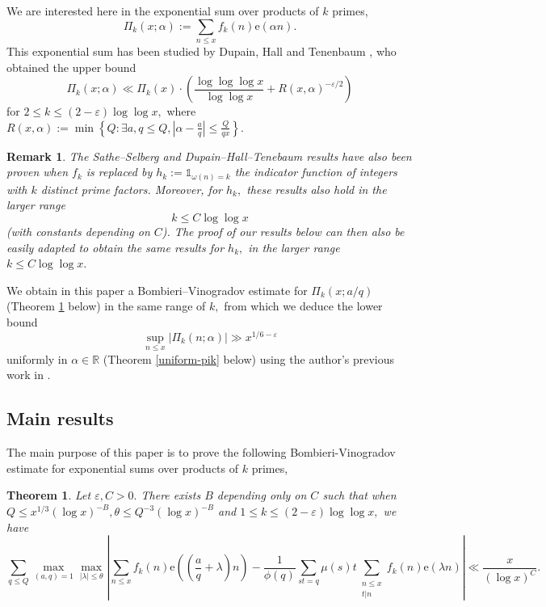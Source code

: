 \documentclass{article}
\newtheorem{theorem}[prop]{Theorem}
\newtheorem*{remark}{Remark}
\newcommand{\e}{\mathrm{e}}
\newcommand{\R}{\mathds{R}}
\newcommand{\Ind}{\mathbb{1}}
\newcommand{\eps}{\varepsilon}
\begin{document}
We are interested here in the exponential sum over products of $k$ primes, $$\Pi_k(x;\alpha) := \sum_{n\le x} f_k(n) \e(\alpha n).$$
This exponential sum has been studied by Dupain, Hall and Tenenbaum \cite{dht, tenenbaum}, who obtained the upper bound \cite[Theorem A]{tenenbaum}
\begin{equation}
    \Pi_k(x;\alpha) \ll \Pi_k(x)\cdot \left(\frac{\log\log\log x}{\log\log x} + R(x,\alpha)^{-\eps/2}\right)
\end{equation}
for $2\le k\le (2-\eps)\log\log x,$ where $R(x,\alpha) := \min\left\{Q: \exists a,q\le Q, \left|\alpha - \frac{a}{q}\right| \le \frac{Q}{qx}\right\}.$
\begin{remark}
    The Sathe--Selberg and Dupain--Hall--Tenebaum results have also been proven when $f_k$ is replaced by $h_k := \Ind_{\omega(n) = k}$ the indicator function of integers with $k$ distinct prime factors. Moreover, for $h_k,$ these results also hold in the larger range $$k \le C \log\log x$$ (with constants depending on $C$). The proof of our results below can then also be easily adapted to obtain the same results for $h_k,$ in the larger range $k\le C\log\log x.$
\end{remark}

We obtain in this paper a Bombieri--Vinogradov estimate for $\Pi_k(x;a/q)$ (Theorem \ref{main} below) in the same range of $k,$ from which we deduce the lower bound $$\sup_{n\le x} |\Pi_k(n;\alpha)| \gg x^{1/6-\eps}$$ uniformly in $\alpha\in\R$ (Theorem \ref{uniform-pik} below) using the author's previous work in \cite{self}.

\subsection{Main results}

The main purpose of this paper is to prove the following Bombieri-Vinogradov estimate for exponential sums over products of $k$ primes,

\begin{theorem}\label{main}
    Let $\eps, C > 0.$ There exists $B$ depending only on $C$ such that when $Q \le x^{1/3}(\log x)^{-B}, \theta \le Q^{-3}(\log x)^{-B}$  and $1 \le k \le (2-\eps)\log\log x,$ we have
    \begin{equation}\label{main-eq}
        \sum_{q\le Q} \max_{(a,q) = 1} \max_{|\lambda|\le\theta} \left|\sum_{n\le x} f_k(n) \e\left(\left(\frac{a}{q}+\lambda\right)n\right) - \frac{1}{\phi(q)}\sum_{st = q} \mu(s) t\sum_{\substack{n\le x \\ t|n}} f_k(n)\e(\lambda n) \right| \ll \frac{x}{(\log x)^C}.
    \end{equation}
\end{theorem}
\end{document}
